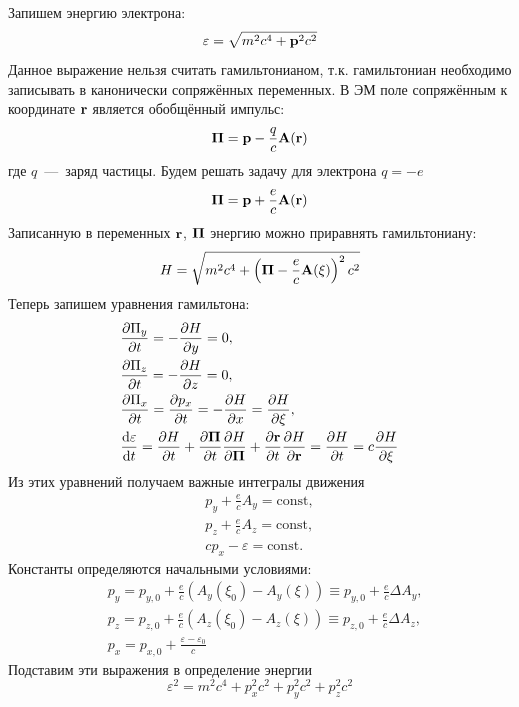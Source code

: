 \documentclass[10pt, a4paper]{article}
\begin{document}
Запишем энергию электрона:
\begin{equation*}
	\varepsilon = \sqrt{m^2c^4 + \vb{p}^2 c^2}
\end{equation*}
Данное выражение нельзя считать гамильтонианом, т.к. гамильтониан необходимо записывать в канонически сопряжённых переменных. В ЭМ поле сопряжённым к координате $\vb{r}$ является обобщённый импульс:
\begin{equation*}
	\vb{\Pi} = \vb{p} - \frac{q}{c}\vb{A}(\vb{r})
\end{equation*}
где $q$~---~заряд частицы. Будем решать задачу для электрона $q=-e$
\begin{equation*}
	\vb{\Pi} = \vb{p} + \frac{e}{c}\vb{A}(\vb{r})
\end{equation*}
Записанную в переменных $\vb{r}$, $\vb{\Pi}$ энергию можно приравнять гамильтониану:
\begin{equation*}
	H = \sqrt{m^2c^4 + \left( \vb{\Pi} - \frac{e}{c}\vb{A}(\xi) \right)^2 c^2}
\end{equation*}
Теперь запишем уравнения гамильтона:
\begin{align*}
    &\pdv{\Pi_y}{t} = -\pdv{H}{y} = 0 ,\\
    &\pdv{\Pi_z}{t} = -\pdv{H}{z} = 0 ,\\
    &\pdv{\Pi_x}{t} = \pdv{p_x}{t} = -\pdv{H}{x} = \pdv{H}{\xi} ,\\
    &\dv{\varepsilon}{t} = \pdv{H}{t} + \pdv{\vb{\Pi}}{t}\pdv{H}{\vb{\Pi}}+ \pdv{\vb{r}}{t}\pdv{H}{\vb{r}} = \pdv{H}{t} = c\pdv{H}{\xi}
\end{align*}
Из этих уравнений получаем важные интегралы движения
\begin{align*}
    p_y + \frac{e}{c}A_y = \text{const} ,\\
    p_z + \frac{e}{c}A_z = \text{const} ,\\
    cp_x - \varepsilon = \text{const}.
\end{align*}
Константы определяются начальными условиями:
\begin{align*}
    &p_y = p_{y, 0} + \frac{e}{c}\left( A_y(\xi_0) - A_y(\xi) \right)\equiv p_{y, 0} + \frac{e}{c}\Delta A_y ,\\
    &p_z = p_{z, 0} + \frac{e}{c}\left( A_z(\xi_0) - A_z(\xi) \right)\equiv p_{z, 0} + \frac{e}{c}\Delta A_z ,\\
    &p_x = p_{x, 0} + \frac{\varepsilon-\varepsilon_0}{c}
\end{align*}
Подставим эти выражения в определение энергии
\begin{equation*}
    \varepsilon^2 = m^2 c^4 + p_x^2c^2 + p_y^2c^2 + p_z^2c^2
\end{equation*}
\end{document}
